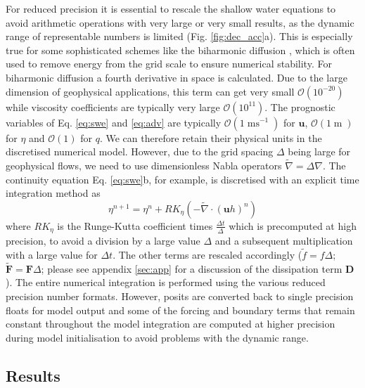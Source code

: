 \documentclass[draft]{agujournal2019}
\newcommand{\op}{\operatorname}
\begin{document}
For reduced precision it is essential to rescale the shallow water equations to avoid arithmetic operations with very large or very small results, as the dynamic range of representable numbers is limited (Fig. \ref{fig:dec_acc}a). This is especially true for some sophisticated schemes like the biharmonic diffusion \cite{Griffies2000}, which is often used to remove energy from the grid scale to ensure numerical stability. For biharmonic diffusion a fourth derivative in space is calculated. Due to the large dimension of geophysical applications, this term can get very small $\mathcal{O}(10^{-20})$ while viscosity coefficients are typically very large $\mathcal{O}(10^{11})$. The prognostic variables of Eq. \ref{eq:swe} and \ref{eq:adv} are typically $\mathcal{O}(1\op{ms}^{-1})$ for $\mathbf{u}$, $\mathcal{O}(1\op{m})$ for $\eta$ and $\mathcal{O}(1)$ for $q$. We can therefore retain their physical units in the discretised numerical model. However, due to the grid spacing $\Delta$ being large for geophysical flows, we need to use dimensionless Nabla operators $\tilde{\nabla} = \Delta\nabla$. The continuity equation Eq. \ref{eq:swe}b, for example, is discretised with an explicit time integration method as
\begin{equation}
\eta^{n+1} = \eta^n + RK_{\eta}\left( - \tilde{\nabla} \cdot (\mathbf{u}h)^n\right)
\end{equation}
where $RK_\eta$ is the Runge-Kutta coefficient times $\tfrac{\Delta t}{\Delta}$ which is precomputed at high precision, to avoid a division by a large value $\Delta$ and a subsequent multiplication with a large value for $\Delta t$. The other terms are rescaled accordingly ($\tilde{f} = f\Delta$; $\tilde{\mathbf{F}} = \mathbf{F}\Delta$; please see appendix \ref{sec:app} for a discussion of the dissipation term $\mathbf{D}$). The entire numerical integration is performed using the various reduced precision number formats. However, posits are converted back to single precision floats for model output and some of the forcing and boundary terms that remain constant throughout the model integration are computed at higher precision during model initialisation to avoid problems with the dynamic range.


\subsection{Results}
\end{document}
